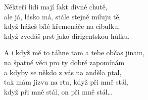 \ve{}
Někteří lidi mají fakt divné chutě,\\
ale já, lásko má, stále stejně miluju tě,\\
když hážeš bílé křemenáče na cibulku,\\
když zvedáš prst jako dirigentskou hůlku.

A i když mě to táhne tam a tebe občas jinam,\\
na špatné věci pro ty dobré zapomínám\\
a kdyby se někdo z vás na anděla ptal,\\
tak mám jizvu na rtu, když při mně stál,\\
když při mně stál, on při mně stál\ldots

\esong{}